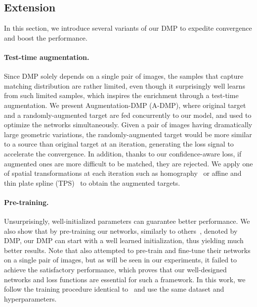 \documentclass[10pt,twocolumn,letterpaper]{article}
\begin{document}
\subsection{Extension}\label{sec:3_4}
In this section, we introduce several variants of our DMP to expedite convergence and boost the performance.
\vspace{-10pt}

\paragraph{Test-time augmentation.}
Since DMP solely depends on a single pair of images, the samples that capture matching distribution are rather limited, even though it surprisingly well learns from such limited samples, which inspires the enrichment through a test-time augmentation. 
We present Augmentation-DMP (A-DMP), where original target and a randomly-augmented target are fed concurrently to our model, and used to optimize the networks simultaneously. Given a pair of images having dramatically large geometric variations, the randomly-augmented target would be more similar to a source than original target at an iteration, generating the loss signal to accelerate the convergence. In addition, thanks to our confidence-aware loss, if augmented ones are more difficult to be matched, they are rejected. We apply one of spatial transformations at each iteration such as homography~\cite{detone2016deep} or affine and thin plate spline (TPS)~\cite{rocco2017convolutional} to obtain the augmented targets. 
\vspace{-10pt}

\paragraph{Pre-training.}
Unsurprisingly, well-initialized parameters can guarantee better performance. We also show that by pre-training our networks, similarly to others~\cite{truong2020glu,truong2020gocor}, denoted by DMP, our DMP can start with a well learned initialization, thus yielding much better results. Note that \cite{shen2020ransac} also attempted to pre-train and fine-tune their networks on a single pair of images, but as will be seen in our experiments, it failed to achieve the satisfactory performance, which proves that our well-designed networks and loss functions are essential for such a framework. 
In this work, we follow the training procedure identical to~\cite{truong2020glu} and use the same dataset and hyperparameters.
\end{document}
